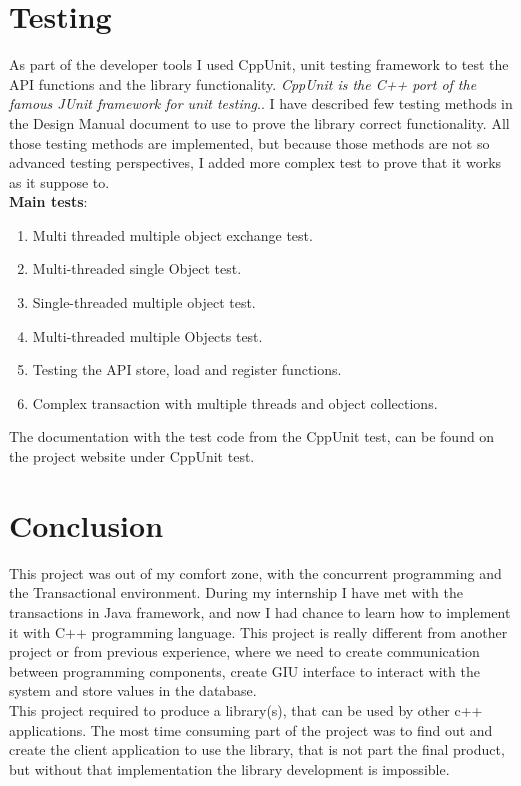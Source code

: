 \documentclass[12pt]{article}
\begin{document}
\section{Testing}
As part of the developer tools I used CppUnit, unit testing framework to test the API functions and the library functionality.  
\textit{CppUnit is the C++ port of the famous JUnit framework for unit testing}.\cite{sourceforge}\cite{cookbook}. I have described few testing methods in the Design Manual document to use to prove the library correct functionality. All those testing methods are implemented, but because those methods are not so advanced testing perspectives, I added more complex test to prove that it works as it suppose to.\\
\textbf{Main tests}:
\begin{enumerate}
\item Multi threaded multiple object exchange test.
\item Multi-threaded single Object test.
\item Single-threaded multiple object test.
\item Multi-threaded multiple Objects test.
\item Testing the API store, load and register functions.
\item Complex transaction with multiple threads and object collections.
\end{enumerate}

The documentation with the test code from the CppUnit test, can be found on the project website under CppUnit test.
\section{Conclusion}
This project was out of my comfort zone, with the concurrent programming and the Transactional environment. During my internship I have met with the transactions in Java framework, and now I had chance to learn how to implement it with C++ programming language. This project is really different from another project or from previous experience, where we need to create communication between programming components, create GIU interface to interact with the system and store values in the database.\\

This project required to produce a library(s), that can be used by other c++ applications. The most time consuming part of the project was to find out and create the client application to use the library, that is not part the final product, but without that implementation the library development is impossible.\\
\end{document}
